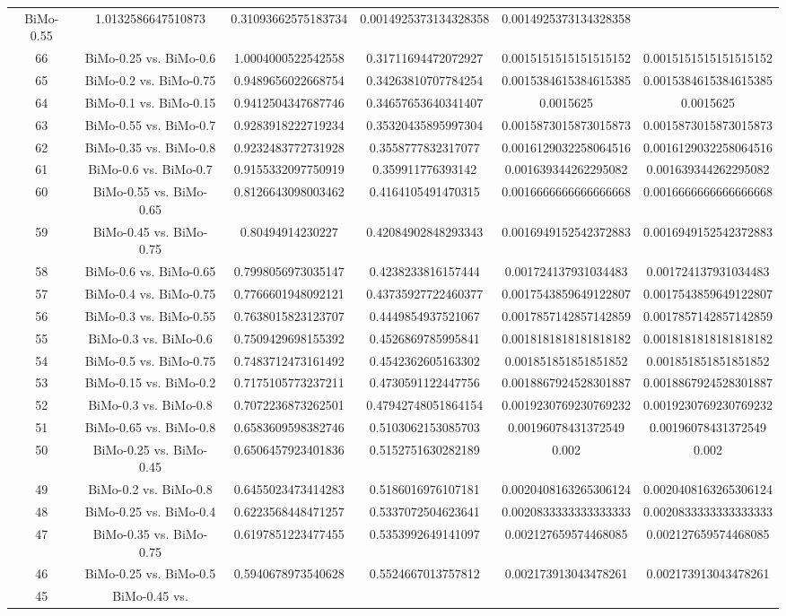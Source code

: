 \documentclass[a4paper,10pt]{article}
\begin{document}
\begin{landscape}
\begin{table}[!htp]
\begin{tabular}{cccccc}
BiMo-0.55&1.0132586647510873&0.31093662575183734&0.0014925373134328358&0.0014925373134328358\\66&BiMo-0.25 vs. BiMo-0.6&1.0004000522542558&0.31711694472072927&0.0015151515151515152&0.0015151515151515152\\65&BiMo-0.2 vs. BiMo-0.75&0.9489656022668754&0.34263810707784254&0.0015384615384615385&0.0015384615384615385\\64&BiMo-0.1 vs. BiMo-0.15&0.9412504347687746&0.34657653640341407&0.0015625&0.0015625\\63&BiMo-0.55 vs. BiMo-0.7&0.9283918222719234&0.35320435895997304&0.0015873015873015873&0.0015873015873015873\\62&BiMo-0.35 vs. BiMo-0.8&0.9232483772731928&0.3558777832317077&0.0016129032258064516&0.0016129032258064516\\61&BiMo-0.6 vs. BiMo-0.7&0.9155332097750919&0.359911776393142&0.001639344262295082&0.001639344262295082\\60&BiMo-0.55 vs. BiMo-0.65&0.8126643098003462&0.4164105491470315&0.0016666666666666668&0.0016666666666666668\\59&BiMo-0.45 vs. BiMo-0.75&0.80494914230227&0.42084902848293343&0.0016949152542372883&0.0016949152542372883\\58&BiMo-0.6 vs. BiMo-0.65&0.7998056973035147&0.4238233816157444&0.001724137931034483&0.001724137931034483\\57&BiMo-0.4 vs. BiMo-0.75&0.7766601948092121&0.43735927722460377&0.0017543859649122807&0.0017543859649122807\\56&BiMo-0.3 vs. BiMo-0.55&0.7638015823123707&0.4449854937521067&0.0017857142857142859&0.0017857142857142859\\55&BiMo-0.3 vs. BiMo-0.6&0.7509429698155392&0.4526869785995841&0.0018181818181818182&0.0018181818181818182\\54&BiMo-0.5 vs. BiMo-0.75&0.7483712473161492&0.4542362605163302&0.001851851851851852&0.001851851851851852\\53&BiMo-0.15 vs. BiMo-0.2&0.7175105773237211&0.4730591122447756&0.0018867924528301887&0.0018867924528301887\\52&BiMo-0.3 vs. BiMo-0.8&0.7072236873262501&0.47942748051864154&0.0019230769230769232&0.0019230769230769232\\51&BiMo-0.65 vs. BiMo-0.8&0.6583609598382746&0.5103062153085703&0.00196078431372549&0.00196078431372549\\50&BiMo-0.25 vs. BiMo-0.45&0.6506457923401836&0.5152751630282189&0.002&0.002\\49&BiMo-0.2 vs. BiMo-0.8&0.6455023473414283&0.5186016976107181&0.0020408163265306124&0.0020408163265306124\\48&BiMo-0.25 vs. BiMo-0.4&0.6223568448471257&0.5337072504623641&0.0020833333333333333&0.0020833333333333333\\47&BiMo-0.35 vs. BiMo-0.75&0.6197851223477455&0.5353992649141097&0.002127659574468085&0.002127659574468085\\46&BiMo-0.25 vs. BiMo-0.5&0.5940678973540628&0.5524667013757812&0.002173913043478261&0.002173913043478261\\45&BiMo-0.45 vs. 
\end{tabular}
\end{table}
\end{landscape}
\end{document}
